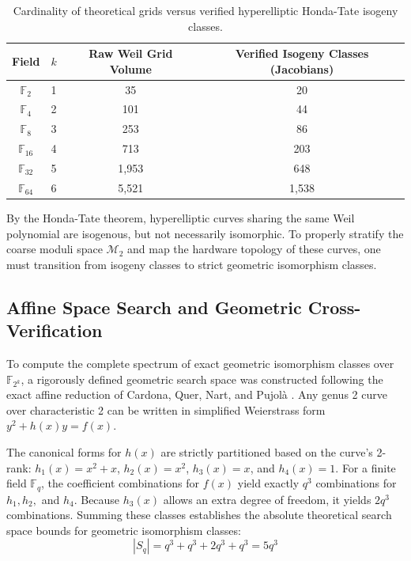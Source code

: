 \documentclass[letterpaper, 11pt]{article}
\begin{document}
	\begin{table}[h!]
		\centering
		\begin{tabular}{cccc}
			\toprule
			Field & $k$ & Raw Weil Grid Volume & Verified Isogeny Classes (Jacobians) \\
			\midrule
			$\mathbb{F}_2$ & 1 & 35 & 20 \\
			$\mathbb{F}_4$ & 2 & 101 & 44 \\
			$\mathbb{F}_8$ & 3 & 253 & 86 \\
			$\mathbb{F}_{16}$ & 4 & 713 & 203 \\
			$\mathbb{F}_{32}$ & 5 & 1,953 & 648 \\
			$\mathbb{F}_{64}$ & 6 & 5,521 & 1,538 \\
			\bottomrule
		\end{tabular}
		\caption{Cardinality of theoretical grids versus verified hyperelliptic Honda-Tate isogeny classes.}
		\label{tab:isogeny_classes}
	\end{table}
	
	By the Honda-Tate theorem, hyperelliptic curves sharing the same Weil polynomial are isogenous, but not necessarily isomorphic. To properly stratify the coarse moduli space $\mathcal{M}_2$ \cite{Zobernig2021} and map the hardware topology of these curves, one must transition from isogeny classes to strict geometric isomorphism classes.
	
	\subsection{Affine Space Search and Geometric Cross-Verification}
	To compute the complete spectrum of exact geometric isomorphism classes over $\mathbb{F}_{2^k}$, a rigorously defined geometric search space was constructed following the exact affine reduction of Cardona, Quer, Nart, and Pujolà \cite{Cardona2005}. Any genus 2 curve over characteristic 2 can be written in simplified Weierstrass form $y^2 + h(x)y = f(x)$. 
	
	The canonical forms for $h(x)$ are strictly partitioned based on the curve's 2-rank: $h_1(x) = x^2 + x$, $h_2(x) = x^2$, $h_3(x) = x$, and $h_4(x) = 1$. For a finite field $\mathbb{F}_q$, the coefficient combinations for $f(x)$ yield exactly $q^3$ combinations for $h_1, h_2,$ and $h_4$. Because $h_3(x)$ allows an extra degree of freedom, it yields $2q^3$ combinations. Summing these classes establishes the absolute theoretical search space bounds for geometric isomorphism classes:
	\begin{equation}
		|S_q| = q^3 + q^3 + 2q^3 + q^3 = 5q^3
	\end{equation}
	
\end{document}

